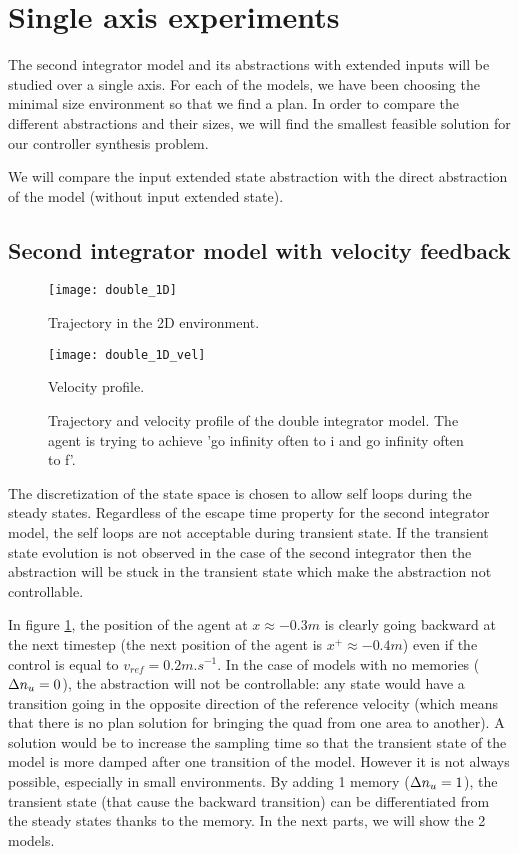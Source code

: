 \section{Single axis experiments}
The second integrator model and its abstractions with extended inputs will be studied over a single axis.
For each of the models, we have been choosing the minimal size environment so that we find a plan. 
In order to compare the different abstractions and their sizes, we will find the smallest feasible solution for our controller synthesis problem.

We will compare the input extended state abstraction with the direct abstraction of the model (without input extended state).

\subsection{Second integrator model with velocity feedback}
\begin{figure}[!ht]
	\begin{minipage}[b]{0.5\textwidth}
  		\centering
  		\texttt{[image: double\_1D]}
	  	\caption{Trajectory in the 2D environment.}
	  	\label{double_1D}
  \end{minipage}
	\begin{minipage}[b]{0.5\textwidth}
  		\centering
  		\texttt{[image: double\_1D\_vel]}
	  	\caption{Velocity profile.}
	  	\label{double_1D_vel}
  \end{minipage}
  \caption{Trajectory and velocity profile of the double integrator model. The agent is trying to achieve 'go infinity often to i and go infinity often to f'.}
\end{figure}

The discretization of the state space is chosen to allow self loops during the steady states.
Regardless of the escape time property for the second integrator model, the self loops are not acceptable during transient state. If the transient state evolution is not observed in the case of the second integrator then the abstraction will be stuck in the transient state which make the abstraction not controllable.

In figure \ref{double_1D_vel}, the position of the agent at $x \approx -0.3m$ is clearly going backward at the next timestep (the next position of the agent is $x^+ \approx -0.4m$) even if the control is equal to $v_{ref} = 0.2m.s^{-1}$.
In the case of models with no memories ($\Delta n_u = 0$),
the abstraction will not be controllable: any state would have a transition going in the opposite direction of the reference velocity (which means that there is no plan solution for bringing the quad from one area to another).
A solution would be to increase the sampling time so that the transient state of the model is more damped after one transition of the model.
However it is not always possible, especially in small environments.
By adding 1 memory ($\Delta n_u=1$), the transient state (that cause the backward transition) can be differentiated from the steady states thanks to the memory.
In the next parts, we will show the 2 models.


